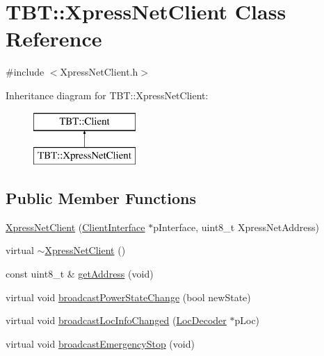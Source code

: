 \hypertarget{classTBT_1_1XpressNetClient}{}\section{T\+BT\+:\+:Xpress\+Net\+Client Class Reference}
\label{classTBT_1_1XpressNetClient}


{\ttfamily \#include $<$Xpress\+Net\+Client.\+h$>$}

Inheritance diagram for T\+BT\+:\+:Xpress\+Net\+Client\+:\begin{figure}[H]
\begin{center}
\leavevmode
\includegraphics[height=2.000000cm]{classTBT_1_1XpressNetClient}
\end{center}
\end{figure}
\subsection*{Public Member Functions}
\begin{DoxyCompactItemize}
\item 
\hyperlink{classTBT_1_1XpressNetClient_a7647a4b5b68c29a2ed7d8832b6d1b692_a7647a4b5b68c29a2ed7d8832b6d1b692}{Xpress\+Net\+Client} (\hyperlink{classTBT_1_1ClientInterface}{Client\+Interface} $\ast$p\+Interface, uint8\+\_\+t Xpress\+Net\+Address)
\item 
virtual \hyperlink{classTBT_1_1XpressNetClient_a6c8fe1f6815ddbf26141d3ed7cdb072c_a6c8fe1f6815ddbf26141d3ed7cdb072c}{$\sim$\+Xpress\+Net\+Client} ()
\item 
const uint8\+\_\+t \& \hyperlink{classTBT_1_1XpressNetClient_aae838c0fdb74c9c7220056e3fa011390_aae838c0fdb74c9c7220056e3fa011390}{get\+Address} (void)
\item 
virtual void \hyperlink{classTBT_1_1XpressNetClient_a6f104050aad16ef336a6b83d2c60550a_a6f104050aad16ef336a6b83d2c60550a}{broadcast\+Power\+State\+Change} (bool new\+State)
\item 
virtual void \hyperlink{classTBT_1_1XpressNetClient_a0ef986da287d7fbfea163ae6016a7154_a0ef986da287d7fbfea163ae6016a7154}{broadcast\+Loc\+Info\+Changed} (\hyperlink{classTBT_1_1LocDecoder}{Loc\+Decoder} $\ast$p\+Loc)
\item 
virtual void \hyperlink{classTBT_1_1XpressNetClient_a5909e439836c772127bc24918aa0a291_a5909e439836c772127bc24918aa0a291}{broadcast\+Emergency\+Stop} (void)
\end{DoxyCompactItemize}
